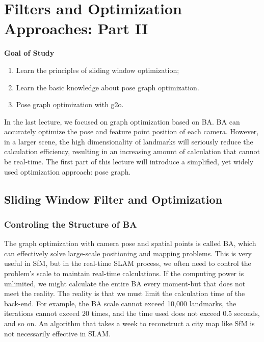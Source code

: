\chapter{Filters and Optimization Approaches: Part II}
\label{cpt:backend2}
\begin{mdframed}  
	\textbf{Goal of Study}
	\begin{enumerate}[labelindent=0em,leftmargin=1.5em]
		\item Learn the principles of sliding window optimization; 
		\item Learn the basic knowledge about pose graph optimization.
		\item Pose graph optimization with g2o. 
	\end{enumerate}
\end{mdframed}

In the last lecture, we focused on graph optimization based on BA. BA can accurately optimize the pose and feature point position of each camera. However, in a larger scene, the high dimensionality of landmarks will seriously reduce the calculation efficiency, resulting in an increasing amount of calculation that cannot be real-time. The first part of this lecture will introduce a simplified, yet widely used optimization approach: pose graph.

\newpage
\section{Sliding Window Filter and Optimization}
\subsection{Controling the Structure of BA}

The graph optimization with camera pose and spatial points is called BA, which can effectively solve large-scale positioning and mapping problems. This is very useful in SfM, but in the real-time SLAM process, we often need to control the problem's scale to maintain real-time calculations. If the computing power is unlimited, we might calculate the entire BA every moment-but that does not meet the reality. The reality is that we must limit the calculation time of the back-end. For example, the BA scale cannot exceed 10,000 landmarks, the iterations cannot exceed 20 times, and the time used does not exceed 0.5 seconds, and so on. An algorithm that takes a week to reconstruct a city map like SfM is not necessarily effective in SLAM.

